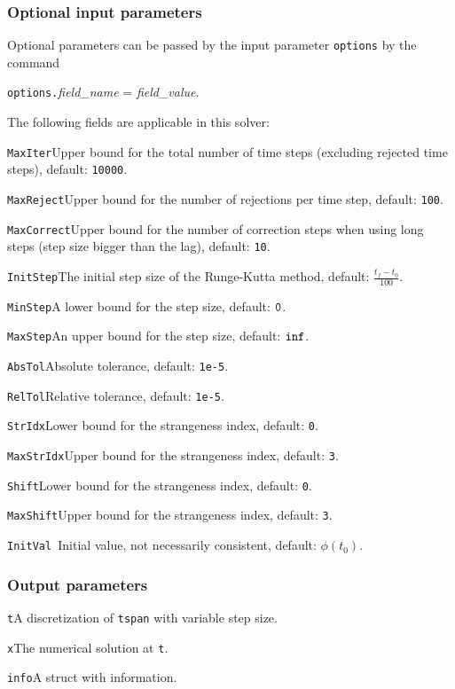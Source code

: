 \documentclass[final,reqno]{siamltex}
\renewenvironment{itemize}[1]{\begin{compactitem}#1}{\end{compactitem}}
\begin{document}
\subsubsection{Optional input parameters}
Optional parameters can be passed by the input parameter {\tt options} by the command 
\begin{center}
{\tt options.}{\it field\_name} = {\it field\_value}.
\end{center}
The following fields are applicable in this solver:
\begin{itemize}
\item {\tt MaxIter}\quad        Upper bound for the total number of time steps (excluding 
	rejected time steps), default: {\tt 10000}.
\item {\tt MaxReject}\quad      Upper bound for the number of rejections per time step, default: {\tt 100}.
\item{\tt MaxCorrect}\quad  Upper bound for the number of correction steps when using
         long steps (step size bigger than the lag), default: {\tt10}.
\item {\tt InitStep}\quad        The initial step size of the Runge-Kutta method, default: $\frac{t_f-t_0}{100}$.
\item {\tt MinStep}\quad         A lower bound for the step size, default: $\tt 0$.
\item {\tt MaxStep}\quad      An upper bound for the step size, default: $\tt inf$.
\item {\tt AbsTol}\quad       Absolute tolerance, default:  {\tt 1e-5}.
\item {\tt RelTol}\quad       Relative tolerance, default:  {\tt 1e-5}.
\item {\tt StrIdx}\quad       Lower bound for the strangeness index,  default: {\tt 0}.
\item {\tt MaxStrIdx}\quad    Upper bound for the strangeness index,  default: {\tt 3}.
\item {\tt Shift}\quad       Lower bound for the strangeness index,  default: {\tt 0}.
\item {\tt MaxShift}\quad    Upper bound for the strangeness index,  default: {\tt 3}.
\item {\tt InitVal  }\quad    Initial value, not necessarily consistent,  default: $\phi(t_0)$.
\end{itemize}

\subsubsection{Output parameters}
\begin{itemize}
\item {\tt t}\quad A discretization of {\tt tspan} with variable step size.
\item {\tt x}\quad The numerical solution at {\tt t}.
\item {\tt info}\quad A struct with information.
\end{itemize}
\end{document}

